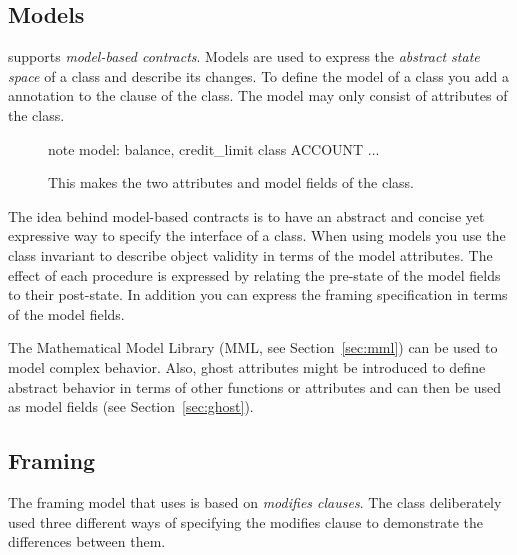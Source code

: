\subsection{Models}

\AutoProof supports \emph{model-based contracts}. Models are used to express the \emph{abstract state space} of a class and describe its changes. To define the model of a class you add a  annotation to the  clause of the class. The model may only consist of attributes of the class.

\begin{figure}
\begin{erunning}
note
	model: balance, credit_limit
class ACCOUNT ...
\end{erunning}
\hspace{0.5cm}
\caption*{This makes the two attributes  and  model fields of the class.}
\end{figure}

The idea behind model-based contracts is to have an abstract and concise yet expressive way to specify the interface of a class. When using models you use the class invariant to describe object validity in terms of the model attributes. The effect of each procedure is expressed by relating the pre-state of the model fields to their post-state. In addition you can express the framing specification in terms of the model fields.

The Mathematical Model Library (MML, see Section~\ref{sec:mml}) can be used to model complex behavior. Also, ghost attributes might be introduced to define abstract behavior in terms of other functions or attributes and can then be used as model fields (see Section~\ref{sec:ghost}).


\subsection{Framing} \label{sec:framing}

The framing model that \AutoProof uses is based on \emph{modifies clauses}. The  class deliberately used three different ways of specifying the modifies clause to demonstrate the differences between them.

